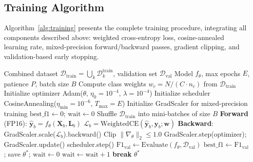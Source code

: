 \documentclass[journal]{IEEEtran}
\begin{document}
\subsection{Training Algorithm}
\label{sec:algorithm}

Algorithm~\ref{alg:training} presents the complete training procedure, integrating all components described above: weighted cross-entropy loss, cosine-annealed learning rate, mixed-precision forward/backward passes, gradient clipping, and validation-based early stopping.

\begin{algorithm}[t]
\caption{Multi-Dataset Training with Early Stopping}
\label{alg:training}
\begin{algorithmic}[1]
\REQUIRE Combined dataset $\mathcal{D}_{\text{train}} = \bigcup_k \mathcal{D}_k^{\text{train}}$, validation set $\mathcal{D}_{\text{val}}$
\REQUIRE Model $f_\theta$, max epochs $E$, patience $P$, batch size $B$
\STATE Compute class weights $w_c = N / (C \cdot n_c)$ from $\mathcal{D}_{\text{train}}$
\STATE Initialize optimizer Adam($\theta$, $\eta_0{=}10^{-4}$, $\lambda{=}10^{-4}$)
\STATE Initialize scheduler CosineAnnealing($\eta_{\min}{=}10^{-6}$, $T_{\max}{=}E$)
\STATE Initialize GradScaler for mixed-precision training
\STATE $\text{best\_f1} \leftarrow 0$; $\text{wait} \leftarrow 0$
  \STATE Shuffle $\mathcal{D}_{\text{train}}$ into mini-batches of size $B$
    \STATE \textbf{Forward} (FP16): $\hat{\mathbf{y}}_b = f_\theta(\mathbf{X}_b, \mathbf{L}_b)$
    \STATE $\mathcal{L}_b = \text{WeightedCE}(\hat{\mathbf{y}}_b, \mathbf{y}_b; \mathbf{w})$
    \STATE \textbf{Backward}: GradScaler.scale($\mathcal{L}_b$).backward()
    \STATE Clip $\|\nabla_\theta\|_2 \leq 1.0$
    \STATE GradScaler.step(optimizer); GradScaler.update()
  \ENDFOR
  \STATE scheduler.step()
  \STATE $\text{F1}_{\text{val}} \leftarrow \text{Evaluate}(f_\theta, \mathcal{D}_{\text{val}})$ 
    \STATE $\text{best\_f1} \leftarrow \text{F1}_{\text{val}}$; save $\theta^*$; $\text{wait} \leftarrow 0$
  \ELSE
    \STATE $\text{wait} \leftarrow \text{wait} + 1$
  \ENDIF
    \STATE \textbf{break} 
  \ENDIF
\ENDFOR
\RETURN $\theta^*$ 
\end{algorithmic}
\end{algorithm}
\end{document}
